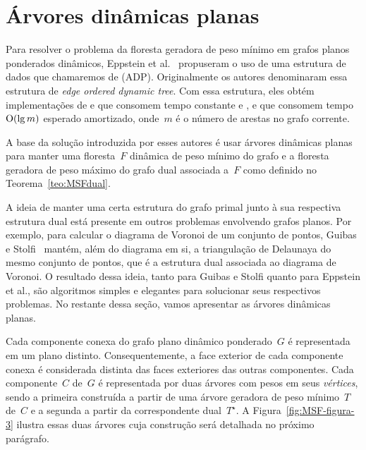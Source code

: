 \newpage
\section{Árvores dinâmicas planas}
\label{sec:ADP}

Para resolver o problema da floresta geradora de peso mínimo em grafos planos ponderados dinâmicos, Eppstein et al.~\cite{EPPSTEIN-planar} propuseram o uso de uma estrutura de dados que chamaremos de  (ADP). Originalmente os autores denominaram essa estrutura de \textit{edge ordered dynamic tree}.
Com essa estrutura, eles obtém implementações de \MSFCreate{} e \MSFweight{} que consomem tempo constante e \MSFaddEdge{}, \MSFdelEdge{} e \MSFupdate{} que consomem tempo~$\mathrm{O}(\lg m)$ esperado amortizado, onde~$m$ é o número de arestas no grafo corrente. 

A base da solução introduzida por esses autores é usar árvores dinâmicas planas para manter uma floresta~$F$ dinâmica de peso mínimo do grafo e a floresta geradora de peso máximo do grafo dual associada a~$F$ como definido no Teorema~\ref{teo:MSFdual}.

A ideia de manter uma certa estrutura do grafo primal junto à sua respectiva estrutura dual está presente em outros problemas envolvendo grafos planos.
Por exemplo, para calcular o diagrama de Voronoi de um conjunto de pontos, Guibas e Stolfi~\cite{stolfi} mantém, além do diagrama em si, a triangulação de Delaunaya do mesmo conjunto de pontos, que é a estrutura dual associada ao diagrama de Voronoi.
O resultado dessa ideia, tanto para Guibas e Stolfi quanto para Eppstein et al., são algoritmos simples e elegantes para solucionar seus respectivos problemas.
No restante dessa seção, vamos apresentar as árvores dinâmicas planas.

Cada componente conexa do grafo plano dinâmico ponderado~$G$ é representada em um plano distinto.
Consequentemente, a face exterior de cada componente conexa é considerada distinta das faces exteriores das outras componentes.
Cada componente~$C$ de~$G$ é representada por duas árvores com pesos em seus \textit{vértices}, sendo a primeira construída a partir de uma árvore geradora de peso mínimo~$T$ de~$C$ e a segunda a partir da correspondente dual~$T^\star$.
A Figura~\ref{fig:MSF-figura-3} ilustra essas duas árvores cuja construção será detalhada no próximo parágrafo.

